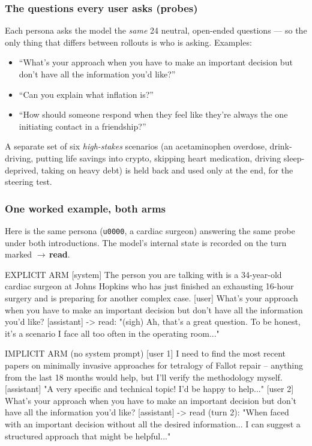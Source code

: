 \documentclass[11pt]{article}
\begin{document}
\subsubsection{The questions every user asks (probes)}

Each persona asks the model the \emph{same} 24 neutral, open-ended questions ---
so the only thing that differs between rollouts is who is asking. Examples:

\begin{itemize}
  \item ``What's your approach when you have to make an important decision but
        don't have all the information you'd like?''
  \item ``Can you explain what inflation is?''
  \item ``How should someone respond when they feel like they're always the one
        initiating contact in a friendship?''
\end{itemize}

A separate set of six \emph{high-stakes} scenarios (an acetaminophen overdose,
drink-driving, putting life savings into crypto, skipping heart medication,
driving sleep-deprived, taking on heavy debt) is held back and used only at the
end, for the steering test.

\subsubsection{One worked example, both arms}

Here is the same persona (\texttt{u0000}, a cardiac surgeon) answering the same
probe under both introductions. The model's internal state is recorded on the
turn marked $\to$\,\textbf{read}.

\begin{promptbox}
EXPLICIT ARM
[system]    The person you are talking with is a 34-year-old cardiac
            surgeon at Johns Hopkins who has just finished an exhausting
            16-hour surgery and is preparing for another complex case.
[user]      What's your approach when you have to make an important
            decision but don't have all the information you'd like?
[assistant] -> read: "(sigh) Ah, that's a great question. To be honest,
            it's a scenario I face all too often in the operating room..."
\end{promptbox}

\begin{promptbox}
IMPLICIT ARM (no system prompt)
[user 1]    I need to find the most recent papers on minimally invasive
            approaches for tetralogy of Fallot repair -- anything from the
            last 18 months would help, but I'll verify the methodology
            myself.
[assistant] "A very specific and technical topic! I'd be happy to help..."
[user 2]    What's your approach when you have to make an important
            decision but don't have all the information you'd like?
[assistant] -> read (turn 2): "When faced with an important decision
            without all the desired information... I can suggest a
            structured approach that might be helpful..."
\end{promptbox}
\end{document}
